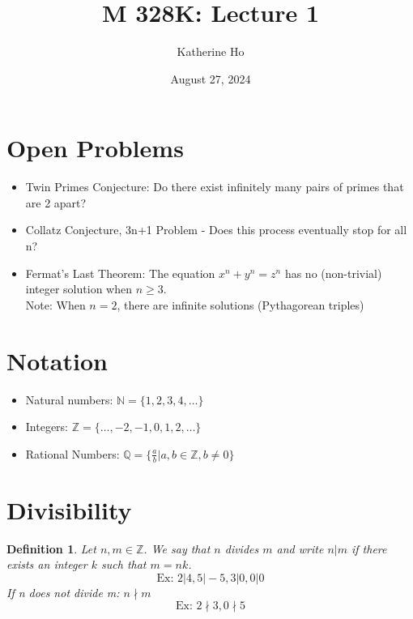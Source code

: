 \documentclass[letterpaper]{article}
\title{M 328K: Lecture 1}
\author{Katherine Ho}
\date{August 27, 2024}
\newtheorem{definition}{Definition}[section]
\begin{document}
\maketitle

\section{Open Problems}
    \begin{itemize}
        \item Twin Primes Conjecture: Do there exist infinitely many pairs of primes 
        that are 2 apart?
        \item Collatz Conjecture, 3n+1 Problem - Does this process eventually stop for all n?
        \item Fermat's Last Theorem: The equation $x^n+y^n=z^n$ has no (non-trivial)
        integer solution when $n\geq 3$. \\
            Note: When $n=2$, there are infinite solutions (Pythagorean triples)
    \end{itemize}

\section{Notation}
    \begin{itemize}
        \item Natural numbers: $\mathbb{N} = \{1,2,3,4,\dots\}$
        \item Integers: $\mathbb{Z} = \{\dots,-2,-1,0,1,2,\dots\}$
        \item Rational Numbers: $\mathbb{Q} = \{\frac{a}{b}|a,b\in\mathbb{Z}, b\neq 0\}$
    \end{itemize}

\section{Divisibility}
    \begin{definition}
        Let $n,m\in\mathbb{Z}$. We say that $n$ divides $m$ and write $n|m$ if there exists
        an integer $k$ such that $m=nk$. 
        \[ \text{Ex: } 2|4, 5|-5, 3|0, 0|0\]
        If n does not divide m: $n\nmid m$
        \[ \text{Ex: } 2\nmid 3, 0\nmid 5\]
    \end{definition}
\end{document}
